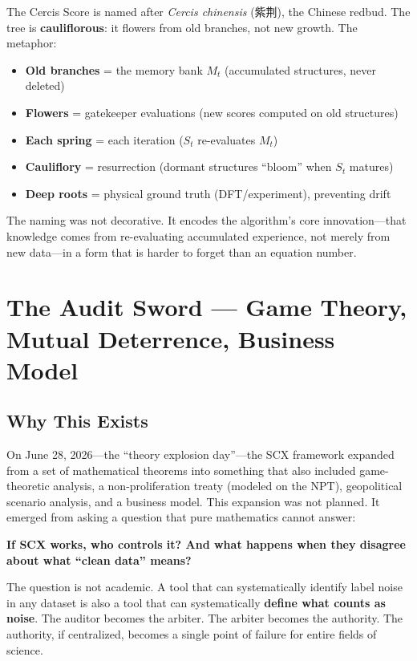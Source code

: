 \documentclass[12pt,a4paper]{ctexart}
\begin{document}
The Cercis Score is named after \textit{Cercis chinensis} (紫荆), the Chinese redbud. The tree is \textbf{cauliflorous}: it flowers from old branches, not new growth. The metaphor:
\begin{itemize}
\item \textbf{Old branches} = the memory bank $M_t$ (accumulated structures, never deleted)
\item \textbf{Flowers} = gatekeeper evaluations (new scores computed on old structures)
\item \textbf{Each spring} = each iteration ($S_t$ re-evaluates $M_t$)
\item \textbf{Cauliflory} = resurrection (dormant structures ``bloom'' when $S_t$ matures)
\item \textbf{Deep roots} = physical ground truth (DFT/experiment), preventing drift
\end{itemize}

The naming was not decorative. It encodes the algorithm's core innovation—that knowledge comes from re-evaluating accumulated experience, not merely from new data—in a form that is harder to forget than an equation number.

\section{The Audit Sword — Game Theory, Mutual Deterrence, Business Model}

\subsection{Why This Exists}

On June 28, 2026—the ``theory explosion day''—the SCX framework expanded from a set of mathematical theorems into something that also included game-theoretic analysis, a non-proliferation treaty (modeled on the NPT), geopolitical scenario analysis, and a business model. This expansion was not planned. It emerged from asking a question that pure mathematics cannot answer:

\textbf{If SCX works, who controls it? And what happens when they disagree about what ``clean data'' means?}

The question is not academic. A tool that can systematically identify label noise in any dataset is also a tool that can systematically \textbf{define what counts as noise}. The auditor becomes the arbiter. The arbiter becomes the authority. The authority, if centralized, becomes a single point of failure for entire fields of science.
\end{document}
